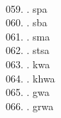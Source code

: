 \begin{tabbing}
\egroup  \\
059.	. 	\> spa 	\> \bgroup\tibetan \def\u#1{\vtop{\baselineskip0pt\hbox{#1}\hbox{\tibsp\char123}}}\parindent=0pt \newbox\fillerbox\setbox\fillerbox\hbox{\vrule height0.4cm depth0.4cm width0pt}\def\filler{\copy\fillerbox}\filler\tibsp{}\tenrm\ \tibetan
\egroup  \\
060.	. 	\> sba 	\> \bgroup\tibetan \def\u#1{\vtop{\baselineskip0pt\hbox{#1}\hbox{\tibsp\char123}}}\parindent=0pt \newbox\fillerbox\setbox\fillerbox\hbox{\vrule height0.4cm depth0.4cm width0pt}\def\filler{\copy\fillerbox}\filler\tibsp{}\tenrm\ \tibetan
\egroup  \\
061.    .  \> sma		\> \bgroup\tibetan \def\u#1{\vtop{\baselineskip0pt\hbox{#1}\hbox{\tibsp\char123}}}\parindent=0pt \newbox\fillerbox\setbox\fillerbox\hbox{\vrule height0.4cm depth0.4cm width0pt}\def\filler{\copy\fillerbox}\filler\tibsp{}\tenrm\ \tibetan
\egroup  \\ 
062.	. 	\> stsa 	\> \bgroup\tibetan \def\u#1{\vtop{\baselineskip0pt\hbox{#1}\hbox{\tibsp\char123}}}\parindent=0pt \newbox\fillerbox\setbox\fillerbox\hbox{\vrule height0.4cm depth0.4cm width0pt}\def\filler{\copy\fillerbox}\filler\tibsp{}\tenrm\ \tibetan
\egroup  \\
063.	. 	\> kwa 	\> \bgroup\tibetan \def\u#1{\vtop{\baselineskip0pt\hbox{#1}\hbox{\tibsp\char123}}}\parindent=0pt \newbox\fillerbox\setbox\fillerbox\hbox{\vrule height0.4cm depth0.4cm width0pt}\def\filler{\copy\fillerbox} \filler\tibsp{}\tenrm\ \tibetan
\egroup  \\
064.	. 	\> khwa 	\> \bgroup\tibetan \def\u#1{\vtop{\baselineskip0pt\hbox{#1}\hbox{\tibsp\char123}}}\parindent=0pt \newbox\fillerbox\setbox\fillerbox\hbox{\vrule height0.4cm depth0.4cm width0pt}\def\filler{\copy\fillerbox} \filler\tibsp{}\tenrm\ \tibetan
\egroup  \\
065.	.	\> gwa	\> \bgroup\tibetan \def\u#1{\vtop{\baselineskip0pt\hbox{#1}\hbox{\tibsp\char123}}}\parindent=0pt \newbox\fillerbox\setbox\fillerbox\hbox{\vrule height0.4cm depth0.4cm width0pt}\def\filler{\copy\fillerbox} \filler\tibsp{}\tenrm\ \tibetan
\egroup  \\
066.	.	\> grwa	\> \bgroup\tibetan \def\u#1{\vtop{\baselineskip0pt\hbox{#1}\hbox{\tibsp\char123}}}\parindent=0pt \newbox\fillerbox\setbox\fillerbox\hbox{\vrule height0.4cm depth0.4cm width0pt}\def\filler{\copy\fillerbox} \filler\tibsp{}\tenrm\ \tibetan

\end{tabbing}
